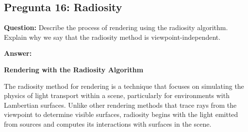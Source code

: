 \documentclass{article}
\begin{document}
\subsection{Pregunta 16: Radiosity}

\textbf{Question:} Describe the process of rendering using the radiosity algorithm. Explain why we say that the radiosity method is viewpoint-independent.

\textbf{Answer:}

\textbf{Rendering with the Radiosity Algorithm}

The radiosity method for rendering is a technique that focuses on simulating the physics of light transport within a scene, particularly for environments with Lambertian surfaces. Unlike other rendering methods that trace rays from the viewpoint to determine visible surfaces, radiosity begins with the light emitted from sources and computes its interactions with surfaces in the scene.
\end{document}
